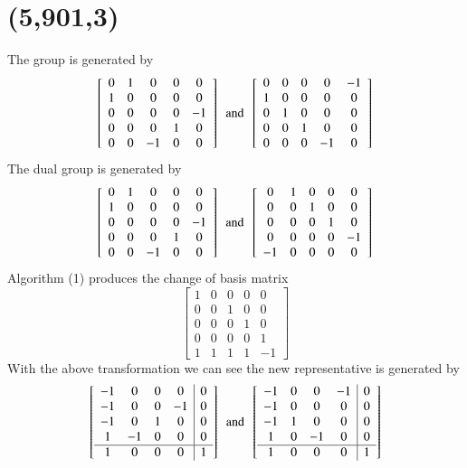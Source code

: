   \section{(5,901,3)}
The group is generated by 
$$
 \left[ \begin {array}{ccccc} 0&1&0&0&0\\1&0&0&0&0
\\0&0&0&0&-1\\0&0&0&1&0
\\0&0&-1&0&0\end {array} \right] 
\,\,\, \text{and} \,\,\,
 \left[ \begin {array}{ccccc} 0&0&0&0&-1\\1&0&0&0&0
\\0&1&0&0&0\\0&0&1&0&0
\\0&0&0&-1&0\end {array} \right] 
$$
The dual group is generated by 
$$
 \left[ \begin {array}{ccccc} 0&1&0&0&0\\1&0&0&0&0
\\0&0&0&0&-1\\0&0&0&1&0
\\0&0&-1&0&0\end {array} \right] 
\,\,\, \text{and} \,\,\,
 \left[ \begin {array}{ccccc} 0&1&0&0&0\\0&0&1&0&0
\\0&0&0&1&0\\0&0&0&0&-1
\\-1&0&0&0&0\end {array} \right] 
$$
Algorithm (1) produces the change of basis matrix 
$$
 \left[ \begin {array}{ccccc} 1&0&0&0&0\\ 0&0&1&0&0
\\ 0&0&0&1&0\\ 0&0&0&0&1
\\ 1&1&1&1&-1\end {array} \right] 
$$
With the above transformation we can see the new representative is generated by 
$$
 \left[ \begin {array}{cccc|c} -1&0&0&0&0\\-1&0&0&-1
&0\\-1&0&1&0&0\\1&-1&0&0&0
\\ \hline 1&0&0&0&1\end {array} \right] 
\,\,\, \text{and} \,\,\,
 \left[ \begin {array}{cccc|c} -1&0&0&-1&0\\-1&0&0&0
&0\\-1&1&0&0&0\\1&0&-1&0&0
\\ \hline 1&0&0&0&1\end {array} \right] 
$$

